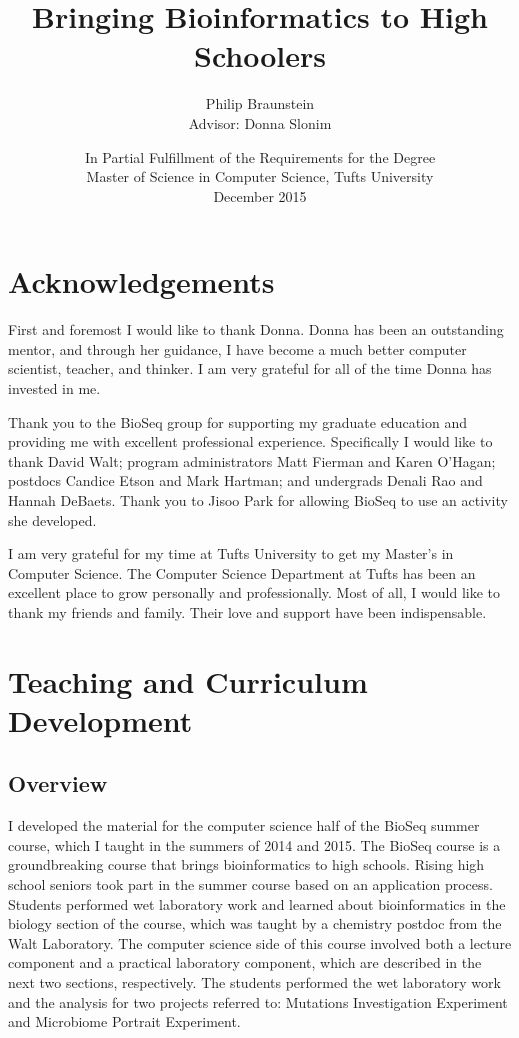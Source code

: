 \documentclass{report}
\title{Bringing Bioinformatics to High Schoolers}
\author{Philip Braunstein\\ Advisor: Donna Slonim}
\date{
In Partial Fulfillment of the Requirements for the Degree \\
Master of Science in Computer Science, Tufts University \\
December 2015
}
\begin{document}

\maketitle

\chapter*{Acknowledgements}
First and foremost I would like to thank Donna. Donna has been an outstanding mentor, and through her guidance, I have become a much better computer scientist, teacher, and thinker. I am very grateful for all of the time Donna has invested in me.

Thank you to the BioSeq group for supporting my graduate education and providing me with excellent professional experience. Specifically I would like to thank David Walt; program administrators Matt Fierman and Karen O'Hagan; postdocs Candice Etson and Mark Hartman; and undergrads Denali Rao and Hannah DeBaets. Thank you to Jisoo Park for allowing BioSeq to use an activity she developed.

I am very grateful for my time at Tufts University to get my Master's in Computer Science. The Computer Science Department at Tufts has been an excellent place to grow personally and professionally. Most of all, I would like to thank my friends and family. Their love and support have been indispensable.

\tableofcontents

\chapter{Teaching and Curriculum Development}
\section{Overview}
I developed the material for the computer science half of the BioSeq summer course, which I taught in the summers of 2014 and 2015. The BioSeq course is a groundbreaking course that brings bioinformatics to high schools. Rising high school seniors took part in the summer course based on an application process. Students performed wet laboratory work and learned about bioinformatics in the biology section of the course, which was taught by a chemistry postdoc from the Walt Laboratory. The computer science side of this course involved both a lecture component and a practical laboratory component, which are described in the next two sections, respectively. The students performed the wet laboratory work and the analysis for two projects referred to: Mutations Investigation Experiment and Microbiome Portrait Experiment. 
\end{document}
